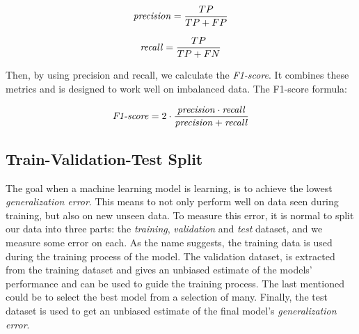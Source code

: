         \begin{equation}
            \textrm{\textit{precision}} = \dfrac{TP}{TP+FP}
        \end{equation}
        
        \begin{equation}
            \textrm{\textit{recall}} = \dfrac{TP}{TP+FN}
        \end{equation}
        
        Then, by using precision and recall, we calculate the \textit{F1-score}\cite{powers2020evaluation_f1_recall_precision}. It combines these metrics and is designed to work well on imbalanced data. The F1-score formula: %
        
        \begin{equation}
            \textrm{\textit{F1-score}} = 2 \cdot \dfrac{\textrm{\textit{precision}} \cdot \textrm{\textit{recall}}}{\textrm{\textit{precision}} + \textrm{\textit{recall}}}
        \end{equation}
        
    \subsection{Train-Validation-Test Split}
        The goal when a machine learning model is learning, is to achieve the lowest \textit{generalization error}\cite{Goodfellow-et-al-2016_generalization}. This means to not only perform well on data seen during training, but also on new unseen data. To measure this error, it is normal to split our data into three parts\cite{Goodfellow-et-al-2016_train_val_test_split}: the \textit{training}, \textit{validation} and \textit{test} dataset, and we measure some error on each. As the name suggests, the training data is used during the training process of the model. The validation dataset, is extracted from the training dataset and gives an unbiased estimate of the models' performance and can be used to guide the training process. The last mentioned could be to select the best model from a selection of many. Finally, the test dataset is used to get an unbiased estimate of the final model's \textit{generalization error}.
        
    
